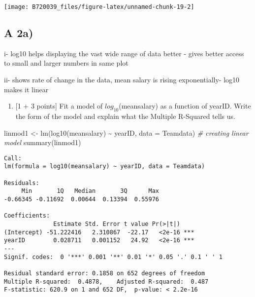 \documentclass[
]{article}
\newenvironment{Shaded}{\begin{snugshade}}{\end{snugshade}}
\newcommand{\AttributeTok}[1]{\textcolor[rgb]{0.77,0.63,0.00}{#1}}
\newcommand{\CommentTok}[1]{\textcolor[rgb]{0.56,0.35,0.01}{\textit{#1}}}
\newcommand{\FunctionTok}[1]{\textcolor[rgb]{0.00,0.00,0.00}{#1}}
\newcommand{\NormalTok}[1]{#1}
\newcommand{\OtherTok}[1]{\textcolor[rgb]{0.56,0.35,0.01}{#1}}
\newcommand{\SpecialCharTok}[1]{\textcolor[rgb]{0.00,0.00,0.00}{#1}}
\providecommand{\tightlist}{%
  \setlength{\itemsep}{0pt}\setlength{\parskip}{0pt}}
\begin{document}
\begin{center}\texttt{[image: B720039\_files/figure-latex/unnamed-chunk-19-2]} \end{center}

\hypertarget{a-2a}{%
\subsection{A 2a)}\label{a-2a}}

i- log10 helps displaying the vast wide range of data better - gives
better access to small and larger numbers in same plot

ii- shows rate of change in the data, mean salary is rising
exponentially- log10 makes it linear

\begin{enumerate}
\def\labelenumi{\alph{enumi}.}
\setcounter{enumi}{1}
\tightlist
\item
  {[}1 + 3 points{]} Fit a model of \(log_{10}\)(meansalary) as a
  function of yearID. Write the form of the model and explain what the
  Multiple R-Squared tells us.
\end{enumerate}

\begin{Shaded}
\begin{Highlighting}[]
\NormalTok{linmod1 }\OtherTok{\textless{}{-}} \FunctionTok{lm}\NormalTok{(}\FunctionTok{log10}\NormalTok{(meansalary) }\SpecialCharTok{\textasciitilde{}}\NormalTok{ yearID, }\AttributeTok{data =}\NormalTok{ Teamdata) }\CommentTok{\# creating linear model}
\FunctionTok{summary}\NormalTok{(linmod1)}
\end{Highlighting}
\end{Shaded}

\begin{verbatim}
Call:
lm(formula = log10(meansalary) ~ yearID, data = Teamdata)

Residuals:
     Min       1Q   Median       3Q      Max 
-0.66345 -0.11692  0.00644  0.13394  0.55976 

Coefficients:
              Estimate Std. Error t value Pr(>|t|)    
(Intercept) -51.222416   2.310867  -22.17   <2e-16 ***
yearID        0.028711   0.001152   24.92   <2e-16 ***
---
Signif. codes:  0 '***' 0.001 '**' 0.01 '*' 0.05 '.' 0.1 ' ' 1

Residual standard error: 0.1858 on 652 degrees of freedom
Multiple R-squared:  0.4878,    Adjusted R-squared:  0.487 
F-statistic: 620.9 on 1 and 652 DF,  p-value: < 2.2e-16
\end{verbatim}
\end{document}
